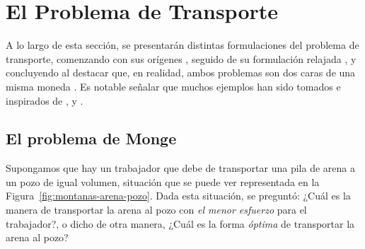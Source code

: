 \section{El Problema de Transporte}
 {
  A lo largo de esta sección, se presentarán distintas formulaciones del problema de transporte, comenzando con sus orígenes \cite{monge1781memoire}, seguido de su formulación relajada \cite{kantorovich1942translocation}, y concluyendo al destacar que, en realidad, ambos problemas son dos caras de una misma moneda \cite{brenier1991polar}. Es notable señalar que muchos ejemplos han sido tomados e inspirados de \cite{panaretos2020invitation}, \cite{peyre2019computational} y \cite{cuturi2017primer}.


  \subsection*{El problema de Monge}
  {


	  Supongamos que hay un trabajador que debe de transportar una pila de arena a un pozo de igual volumen, situación que se puede ver representada en la Figura~\ref{fig:montanas-arena-pozo}. Dada esta situación, \cite{monge1781memoire} se preguntó: ¿Cuál es la manera de transportar la arena al pozo con \emph{el menor esfuerzo} para el trabajador?, o dicho de otra manera, ¿Cuál es la forma \emph{óptima} de transportar la arena al pozo?


}}

